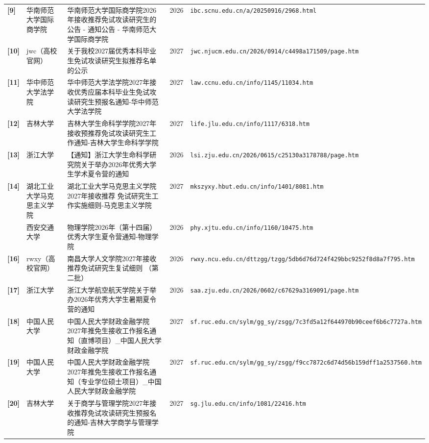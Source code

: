 {\begin{longtable}{@{}p{1.15cm}p{2.9cm}p{6.3cm}p{0.85cm}p{5.0cm}@{}}
\textbf{[9]} & 华南师范大学国际商学院 & 华南师范大学国际商学院2026年接收推荐免试攻读研究生的公告 - 通知公告 - 华南师范大学国际商学院 & 2026 & \texttt{ibc.scnu.edu.cn/a/20250916/2968.html} \\
\textbf{[10]} & jwc（高校官网） & 关于我校2027届优秀本科毕业生免试攻读研究生拟推荐名单的公示 & 2027 & \texttt{jwc.njucm.edu.cn/2026/0914/c4498a171509/page.htm} \\
\textbf{[11]} & 华中师范大学法学院 & 华中师范大学法学院2027年接收优秀应届本科毕业生免试攻读研究生预报名通知-华中师范大学法学院 & 2027 & \texttt{law.ccnu.edu.cn/info/1145/11034.htm} \\
\textbf{[12]} & 吉林大学 & 吉林大学生命科学学院2027年接收预推荐免试攻读研究生工作通知-吉林大学生命科学学院 & 2027 & \texttt{life.jlu.edu.cn/info/1117/6318.htm} \\
\textbf{[13]} & 浙江大学 & 【通知】浙江大学生命科学研究院关于举办2026年优秀大学生学术夏令营的通知 & 2026 & \texttt{lsi.zju.edu.cn/2026/0615/c25130a3178788/page.htm} \\
\textbf{[14]} & 湖北工业大学马克思主义学院 & 湖北工业大学马克思主义学院2027年接收推荐 免试研究生工作实施细则-马克思主义学院 & 2027 & \texttt{mkszyxy.hbut.edu.cn/info/1401/8081.htm} \\
[15] & 西安交通大学 & 物理学院2026年（第十四届）优秀大学生夏令营通知-物理学院 & 2026 & \texttt{phy.xjtu.edu.cn/info/1160/10475.htm} \\
\textbf{[16]} & rwxy（高校官网） & 南昌大学人文学院2027年接收推荐免试研究生复试细则 （第二批） & 2026 & \texttt{rwxy.ncu.edu.cn/dttzgg/tzgg/5db6d76d724f429bbc9252f8d8a7f795.htm} \\
\textbf{[17]} & 浙江大学 & 浙江大学航空航天学院关于举办2026年优秀大学生暑期夏令营的通知 & 2026 & \texttt{saa.zju.edu.cn/2026/0602/c67629a3169091/page.htm} \\
\textbf{[18]} & 中国人民大学 & 中国人民大学财政金融学院2027年推免生接收工作报名通知（直博项目）\_中国人民大学财政金融学院 & 2027 & \texttt{sf.ruc.edu.cn/sylm/gg\_sy/zsgg/7c3fd5a12f644970b90ceef6b6c7727a.htm} \\
\textbf{[19]} & 中国人民大学 & 中国人民大学财政金融学院2027年推免生接收工作报名通知（专业学位硕士项目）\_中国人民大学财政金融学院 & 2027 & \texttt{sf.ruc.edu.cn/sylm/gg\_sy/zsgg/f9cc7872c6d74d56b159dff1a2537560.htm} \\
\textbf{[20]} & 吉林大学 & 关于商学与管理学院2027年接收推荐免试攻读研究生预报名的通知-吉林大学商学与管理学院 & 2027 & \texttt{sg.jlu.edu.cn/info/1081/22416.htm} \\

\end{longtable}}
